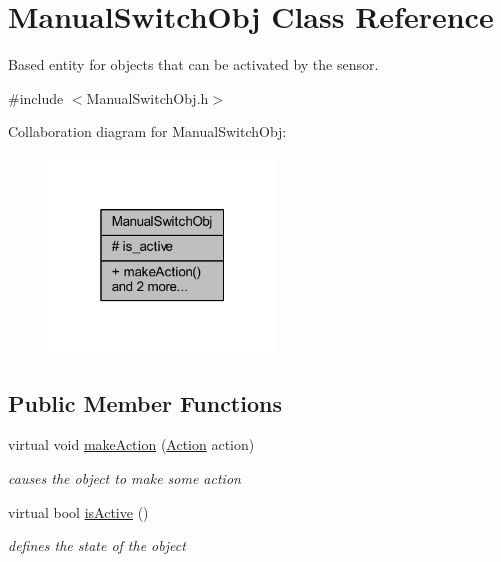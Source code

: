 \hypertarget{class_manual_switch_obj}{}\section{Manual\+Switch\+Obj Class Reference}
\label{class_manual_switch_obj}


Based entity for objects that can be activated by the sensor.  




{\ttfamily \#include $<$Manual\+Switch\+Obj.\+h$>$}



Collaboration diagram for Manual\+Switch\+Obj\+:\nopagebreak
\begin{figure}[H]
\begin{center}
\leavevmode
\includegraphics[width=172pt]{class_manual_switch_obj__coll__graph}
\end{center}
\end{figure}
\subsection*{Public Member Functions}
\begin{DoxyCompactItemize}
\item 
virtual void \hyperlink{class_manual_switch_obj_a4d4a826fb8211a787f158b2973f843ae}{make\+Action} (\hyperlink{_manual_switch_obj_8h_a8bb1ef53467e4f61410d12822d922498}{Action} action)
\begin{DoxyCompactList}\small\item\em causes the object to make some action \end{DoxyCompactList}\item 
virtual bool \hyperlink{class_manual_switch_obj_a4d6cc0a3de424ab6bf4665eeb0f639af}{is\+Active} ()
\begin{DoxyCompactList}\small\item\em defines the state of the object \end{DoxyCompactList}\end{DoxyCompactItemize}
